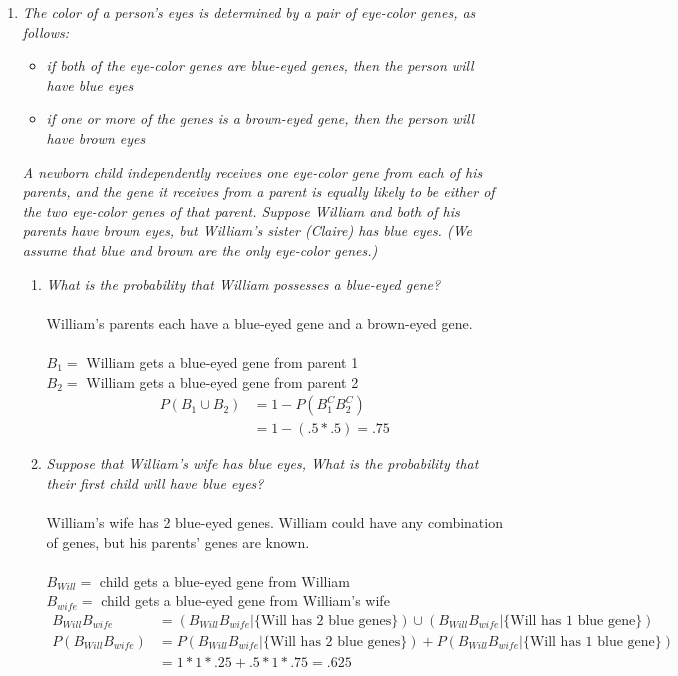 \documentclass{article} %
\begin{document}
\begin{enumerate}
\begin{enumerate}
	\end{enumerate}
	
	\item \textit{The color of a person's eyes is determined by a pair of eye-color genes, as follows:}
	\begin{itemize}
	\item \textit{if both of the eye-color genes are blue-eyed genes, then the person will have blue eyes}	
	\item \textit{if one or more of the genes is a brown-eyed gene, then the person will have brown eyes}			
	\end{itemize}
	
	\textit{A newborn child independently receives one eye-color gene from each of his parents, and the gene it receives from a parent is equally likely to be either of the two eye-color genes of that parent. Suppose William and both of his parents have brown eyes, but William's sister (Claire) has blue eyes. (We assume that blue and brown are the only eye-color genes.)}
	\begin{enumerate}
	\item \textit{What is the probability that William possesses a blue-eyed gene?}\\
	\\
	William's parents each have a blue-eyed gene and a brown-eyed gene.\\
	\\
	$B_1 =$ William gets a blue-eyed gene from parent 1\\
	$B_2 =$ William gets a blue-eyed gene from parent 2
	\begin{align*}
	P(B_1 \cup B_2) &= 1 - P(B_1^CB_2^C)\\
	&= 1 - (.5 * .5) = .75
	\end{align*}
	
	\item \textit{Suppose that William's wife has blue eyes, What is the probability that their first child will have blue eyes?}\\
	\\
	William's wife has 2 blue-eyed genes. William could have any combination of genes, but his parents' genes are known.\\
	\\
	$B_{Will} =$ child gets a blue-eyed gene from William\\
	$B_{wife} =$ child gets a blue-eyed gene from William's wife\\
	\begin{align*}
	B_{Will}B_{wife} &= (B_{Will}B_{wife} | \text{\{Will has 2 blue genes\}}) \cup (B_{Will}B_{wife} | \text{\{Will has 1 blue gene\}})\\
	P(B_{Will}B_{wife}) &= P(B_{Will}B_{wife} | \text{\{Will has 2 blue genes\}}) + P(B_{Will}B_{wife} | \text{\{Will has 1 blue gene\}})\\
	&= 1 * 1 * .25 + .5 * 1 * .75 = .625
	\end{align*}
	

\end{enumerate}
\end{enumerate}
\end{document}
